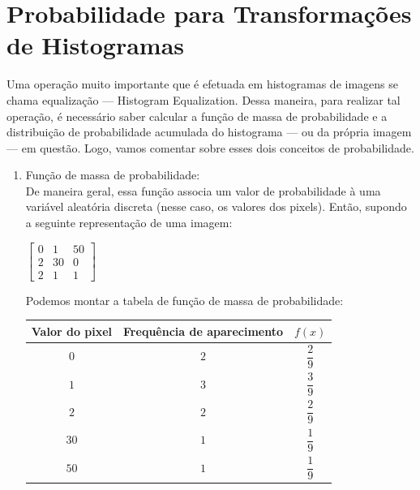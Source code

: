\documentclass[a4paper, 12pt]{article}
\begin{document}
\section{Probabilidade para Transformações de Histogramas}
Uma operação muito importante que é efetuada em histogramas de imagens se chama equalização --- Histogram Equalization. Dessa maneira, para realizar tal 
operação, é necessário saber calcular a função de massa de probabilidade e a distribuição de probabilidade acumulada do histograma --- ou 
da própria imagem --- em questão. Logo, vamos 
comentar sobre esses dois conceitos de probabilidade.
\begin{enumerate}
	\item Função de massa de probabilidade:
    \\
	De maneira geral, essa função associa um valor de probabilidade à uma variável aleatória discreta (nesse caso, os valores dos pixels).
	Então, supondo a seguinte representação de uma imagem:
	\\

	\begin{table}[!htbp]
		\centering
		$
		\begin{bmatrix}
			0 & 1  & 50 \\
			2 & 30 & 0  \\
			2 & 1  & 1
		\end{bmatrix}
		$
	\end{table}
	Podemos montar a tabela de função de massa de probabilidade:
	\\

	\begin{center}
		\begingroup
		\renewcommand*{\arraystretch}{2.2}
		\begin{tabular}{|c|c|c|}
			\hline
			Valor do pixel & Frequência de aparecimento & $f(x)$     \\ \hline
			$0$            & $2$                        & $\dfrac{2}{9}$ \\ \hline
			$1$            & $3$                        & $\dfrac{3}{9}$ \\ \hline
			$2$            & $2$                        & $\dfrac{2}{9}$ \\ \hline
			$30$           & $1$                        & $\dfrac{1}{9}$ \\ \hline
			$50$           & $1$                        & $\dfrac{1}{9}$ \\ \hline
			\end{tabular}
		\endgroup
	\end{center}



\end{enumerate}
\end{document}
